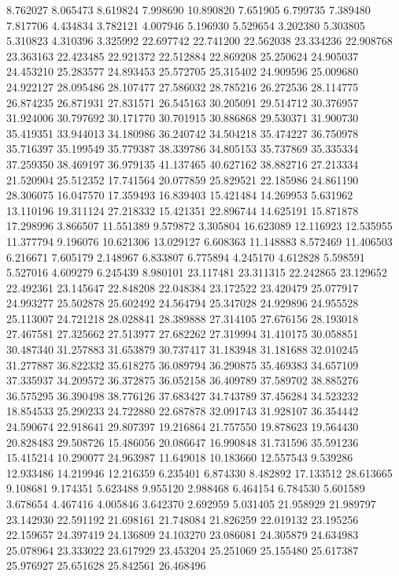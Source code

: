 8.762027
8.065473
8.619824
7.998690
10.890820
7.651905
6.799735
7.389480
7.817706
4.434834
3.782121
4.007946
5.196930
5.529654
3.202380
5.303805
5.310823
4.310396
3.325992
22.697742
22.741200
22.562038
23.334236
22.908768
23.363163
22.423485
22.921372
22.512884
22.869208
25.250624
24.905037
24.453210
25.283577
24.893453
25.572705
25.315402
24.909596
25.009680
24.922127
28.095486
28.107477
27.586032
28.785216
26.272536
28.114775
26.874235
26.871931
27.831571
26.545163
30.205091
29.514712
30.376957
31.924006
30.797692
30.171770
30.701915
30.886868
29.530371
31.900730
35.419351
33.944013
34.180986
36.240742
34.504218
35.474227
36.750978
35.716397
35.199549
35.779387
38.339786
34.805153
35.737869
35.335334
37.259350
38.469197
36.979135
41.137465
40.627162
38.882716
27.213334
21.520904
25.512352
17.741564
20.077859
25.829521
22.185986
24.861190
28.306075
16.047570
17.359493
16.839403
15.421484
14.269953
5.631962
13.110196
19.311124
27.218332
15.421351
22.896744
14.625191
15.871878
17.298996
3.866507
11.551389
9.579872
3.305804
16.623089
12.116923
12.535955
11.377794
9.196076
10.621306
13.029127
6.608363
11.148883
8.572469
11.406503
6.216671
7.605179
2.148967
6.833807
6.775894
4.245170
4.612828
5.598591
5.527016
4.609279
6.245439
8.980101
23.117481
23.311315
22.242865
23.129652
22.492361
23.145647
22.848208
22.048384
23.172522
23.420479
25.077917
24.993277
25.502878
25.602492
24.564794
25.347028
24.929896
24.955528
25.113007
24.721218
28.028841
28.389888
27.314105
27.676156
28.193018
27.467581
27.325662
27.513977
27.682262
27.319994
31.410175
30.058851
30.487340
31.257883
31.653879
30.737417
31.183948
31.181688
32.010245
31.277887
36.822332
35.618275
36.089794
36.290875
35.469383
34.657109
37.335937
34.209572
36.372875
36.052158
36.409789
37.589702
38.885276
36.575295
36.390498
38.776126
37.683427
34.743789
37.456284
34.523232
18.854533
25.290233
24.722880
22.687878
32.091743
31.928107
36.354442
24.590674
22.918641
29.807397
19.216864
21.757550
19.878623
19.564430
20.828483
29.508726
15.486056
20.086647
16.990848
31.731596
35.591236
15.415214
10.290077
24.963987
11.649018
10.183660
12.557543
9.539286
12.933486
14.219946
12.216359
6.235401
6.874330
8.482892
17.133512
28.613665
9.108681
9.174351
5.623488
9.955120
2.988468
6.464154
6.784530
5.601589
3.678654
4.467416
4.005846
3.642370
2.692959
5.031405
21.958929
21.989797
23.142930
22.591192
21.698161
21.748084
21.826259
22.019132
23.195256
22.159657
24.397419
24.136809
24.103270
23.086081
24.305879
24.634983
25.078964
23.333022
23.617929
23.453204
25.251069
25.155480
25.617387
25.976927
25.651628
25.842561
26.468496

